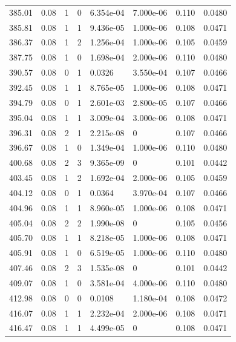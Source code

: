 \documentclass[preview]{standalone}
\begin{document}
{{{\begin{tabular}{L{1.2cm}C{1.2cm} C{0.3cm}C{0.5cm} C{1.4cm}C{1.4cm} C{1.4cm}C{1.4cm}}
  385.01  &  0.08  & 1     &  0 &  6.354e-04  & 7.000e-06  & 0.110 &  0.0480   \\ 
  385.81  &  0.08  & 1     &  1 &  9.436e-05  & 1.000e-06  & 0.108 &  0.0471   \\ 
  386.37  &  0.08  & 1     &  2 &  1.256e-04  & 1.000e-06  & 0.105 &  0.0459   \\ 
  387.75  &  0.08  & 1     &  0 &  1.698e-04  & 2.000e-06  & 0.110 &  0.0480   \\ 
  390.57  &  0.08  & 0     &  1 &  0.0326  & 3.550e-04  & 0.107 &  0.0466   \\ 
  392.45  &  0.08  & 1     &  1 &  8.765e-05  & 1.000e-06  & 0.108 &  0.0471   \\ 
  394.79  &  0.08  & 0     &  1 &  2.601e-03  & 2.800e-05  & 0.107 &  0.0466   \\ 
  395.04  &  0.08  & 1     &  1 &  3.009e-04  & 3.000e-06  & 0.108 &  0.0471   \\ 
  396.31  &  0.08  & 2     &  1 &  2.215e-08  & 0  & 0.107 &  0.0466   \\ 
  396.67  &  0.08  & 1     &  0 &  1.349e-04  & 1.000e-06  & 0.110 &  0.0480   \\ 
  400.68  &  0.08  & 2     &  3 &  9.365e-09  & 0  & 0.101 &  0.0442   \\ 
  403.45  &  0.08  & 1     &  2 &  1.692e-04  & 2.000e-06  & 0.105 &  0.0459   \\ 
  404.12  &  0.08  & 0     &  1 &  0.0364  & 3.970e-04  & 0.107 &  0.0466   \\ 
  404.96  &  0.08  & 1     &  1 &  8.960e-05  & 1.000e-06  & 0.108 &  0.0471   \\ 
  405.04  &  0.08  & 2     &  2 &  1.990e-08  & 0  & 0.105 &  0.0456   \\ 
  405.70  &  0.08  & 1     &  1 &  8.218e-05  & 1.000e-06  & 0.108 &  0.0471   \\ 
  405.91  &  0.08  & 1     &  0 &  6.519e-05  & 1.000e-06  & 0.110 &  0.0480   \\ 
  407.46  &  0.08  & 2     &  3 &  1.535e-08  & 0  & 0.101 &  0.0442   \\ 
  409.07  &  0.08  & 1     &  0 &  3.581e-04  & 4.000e-06  & 0.110 &  0.0480   \\ 
  412.98  &  0.08  & 0     &  0 &  0.0108  & 1.180e-04  & 0.108 &  0.0472   \\ 
  416.07  &  0.08  & 1     &  1 &  2.232e-04  & 2.000e-06  & 0.108 &  0.0471   \\ 
  416.47  &  0.08  & 1     &  1 &  4.499e-05  & 0  & 0.108 &  0.0471   \\ 

\end{tabular}}}}
\end{document}
